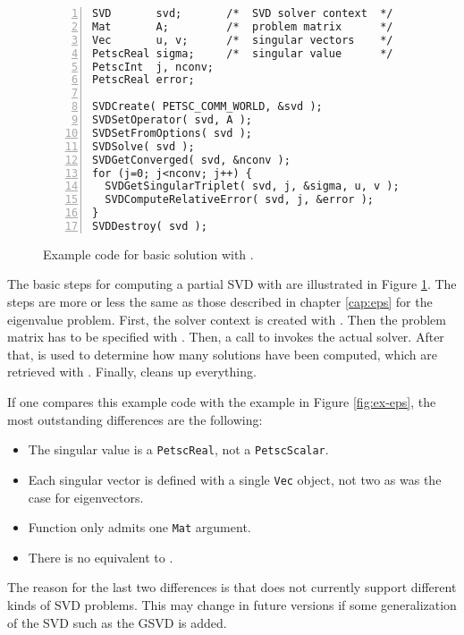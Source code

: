 \begin{figure}
\begin{Verbatim}[fontsize=\small,numbers=left,numbersep=6pt,xleftmargin=15mm]
SVD       svd;       /*  SVD solver context  */
Mat       A;         /*  problem matrix      */
Vec       u, v;      /*  singular vectors    */
PetscReal sigma;     /*  singular value      */
PetscInt  j, nconv;
PetscReal error;

SVDCreate( PETSC_COMM_WORLD, &svd );
SVDSetOperator( svd, A );
SVDSetFromOptions( svd );
SVDSolve( svd );
SVDGetConverged( svd, &nconv );
for (j=0; j<nconv; j++) {
  SVDGetSingularTriplet( svd, j, &sigma, u, v );
  SVDComputeRelativeError( svd, j, &error );
}
SVDDestroy( svd );
\end{Verbatim}
\caption{\label{fig:ex-svd}Example code for basic solution with .}
\end{figure}

The basic steps for computing a partial SVD with \slepc are illustrated in Figure \ref{fig:ex-svd}. The steps are more or less the same as those described in chapter \ref{cap:eps} for the eigenvalue problem. First, the solver context is created with . Then the problem matrix has to be specified with . Then, a call to  invokes the actual solver. After that,  is used to determine how many solutions have been computed, which are retrieved with . Finally,  cleans up everything.

If one compares this example code with the  example in Figure \ref{fig:ex-eps}, the most outstanding differences are the following:
\begin{itemize}
\item The singular value is a \texttt{PetscReal}, not a \texttt{PetscScalar}.
\item Each singular vector is defined with a single \texttt{Vec} object, not two as was the case for eigenvectors.
\item Function  only admits one \texttt{Mat} argument.
\item There is no equivalent to .
\end{itemize}
The reason for the last two differences is that \slepc does not currently support different kinds of SVD problems. This may change in future versions if some generalization of the SVD such as the GSVD is added.

